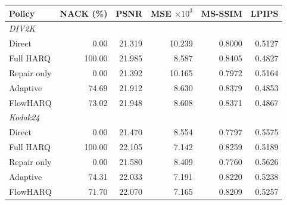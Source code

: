 \begin{tabular}{lrrrrr}
\toprule
Policy & NACK (\%) & PSNR & MSE $\times10^3$ & MS-SSIM & LPIPS \\
\midrule
\multicolumn{6}{l}{\textit{DIV2K}} \\
Direct & 0.00 & 21.319 & 10.239 & 0.8000 & 0.5127 \\
Full HARQ & 100.00 & 21.985 & 8.587 & 0.8405 & 0.4827 \\
Repair only & 0.00 & 21.392 & 10.165 & 0.7972 & 0.5164 \\
Adaptive & 74.69 & 21.912 & 8.630 & 0.8379 & 0.4853 \\
FlowHARQ & 73.02 & 21.948 & 8.608 & 0.8371 & 0.4867 \\
\multicolumn{6}{l}{\textit{Kodak24}} \\
Direct & 0.00 & 21.470 & 8.554 & 0.7797 & 0.5575 \\
Full HARQ & 100.00 & 22.105 & 7.142 & 0.8259 & 0.5189 \\
Repair only & 0.00 & 21.580 & 8.409 & 0.7760 & 0.5626 \\
Adaptive & 74.31 & 22.033 & 7.191 & 0.8220 & 0.5238 \\
FlowHARQ & 71.70 & 22.070 & 7.165 & 0.8209 & 0.5257 \\
\bottomrule
\end{tabular}
